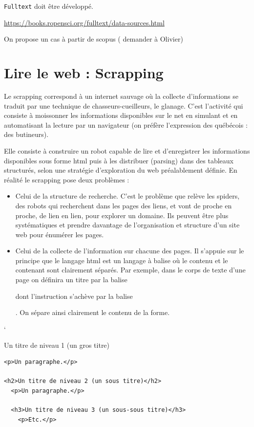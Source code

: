 \documentclass[
  letterpaper,
  DIV=11,
  numbers=noendperiod]{scrreprt}
\begin{document}
\texttt{Fulltext} doit être développé.

\url{https://books.ropensci.org/fulltext/data-sources.html}

On propose un cas à partir de scopus ( demander à Olivier)

\section{Lire le web : Scrapping}\label{lire-le-web-scrapping}

Le scrapping correspond à un internet sauvage où la collecte
d'informations se traduit par une technique de chasseurs-cueilleurs, le
glanage. C'est l'activité qui consiste à moissonner les informations
disponibles sur le net en simulant et en automatisant la lecture par un
navigateur (on préfère l'expression des québécois : des butineurs).

Elle consiste à construire un robot capable de lire et d'enregistrer les
informations disponibles sous forme html puis à les distribuer (parsing)
dans des tableaux structurés, selon une stratégie d'exploration du web
préalablement définie. En réalité le scrapping pose deux problèmes :

\begin{itemize}
\item
  Celui de la structure de recherche. C'est le problème que relève les
  spiders, des robots qui recherchent dans les pages des liens, et vont
  de proche en proche, de lien en lien, pour explorer un domaine. Ils
  peuvent être plus systématiques et prendre davantage de l'organisation
  et structure d'un site web pour énumérer les pages.
\item
  Celui de la collecte de l'information sur chacune des pages. Il
  s'appuie sur le principe que le langage html est un langage à balise
  où le contenu et le contenant sont clairement séparés. Par exemple,
  dans le corps de texte d'une page on définira un titre par la balise

  dont l'instruction s'achève par la balise

  . On sépare ainsi clairement le contenu de la forme.
\end{itemize}

`

Un titre de niveau 1 (un gros titre)

\begin{verbatim}
<p>Un paragraphe.</p>

<h2>Un titre de niveau 2 (un sous titre)</h2>
  <p>Un paragraphe.</p>

  <h3>Un titre de niveau 3 (un sous-sous titre)</h3>
    <p>Etc.</p>
\end{verbatim}
\end{document}

